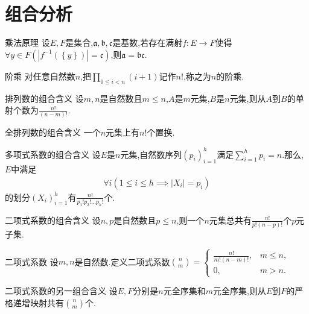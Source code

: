 \section{组合分析}

\begin{proposition}{乘法原理}{}
	设$E,F$是集合,$\mathfrak{a},\mathfrak{b},\mathfrak{c}$是基数,若存在满射$f:E\to F$使得$\forall y\in F\left(\left|f^{-1}\left(\left\{y\right\}\right)\right|=\mathfrak{c}\right)$,则$\mathfrak{a}=\mathfrak{b}\mathfrak{c}$.
\end{proposition}

\begin{definition}{阶乘}{}
	对任意自然数$n$,把$\prod\limits_{0\leq i<n}\left(i+1\right)$记作$n!$,称之为$n$的阶乘.
\end{definition}

\begin{proposition}{排列数的组合含义}{}
	设$m,n$是自然数且$m\leq n$,$A$是$m$元集,$B$是$n$元集,则从$A$到$B$的单射个数为$\frac{n!}{\left(n-m\right)!}$.
\end{proposition}

\begin{corollary}{全排列数的组合含义}{}
	一个$n$元集上有$n!$个置换.
\end{corollary}

\begin{proposition}{多项式系数的组合含义}{}
	设$E$是$n$元集,自然数序列$\left(p_{i}\right)_{i=1}^{h}$满足$\sum\limits_{i=1}^{h}p_{i}=n$.那么,$E$中满足
	\begin{align*}
		\forall i\left(1\leq i\leq h\implies\left|X_{i}\right|=p_{i}\right)
	\end{align*}
	的划分$\left(X_{i}\right)_{i=1}^{h}$有$\frac{n!}{p_{1}!p_{2}!\ldots p_{h}!}$个.
\end{proposition}

\begin{corollary}{二项式系数的组合含义}{}
	设$n,p$是自然数且$p\leq n$,则一个$n$元集总共有$\frac{n!}{p!\left(n-p\right)!}$个$p$元子集.
\end{corollary}

\begin{definition}{二项式系数}{}
	设$m,n$是自然数.定义二项式系数$\binom{n}{m}=
	\begin{cases}
		\frac{n!}{m!\left(n-m\right)!},&m\leq n,\\
		0,&m>n.
	\end{cases}$
\end{definition}

\begin{corollary}{二项式系数的另一组合含义}{}
	设$E,F$分别是$n$元全序集和$m$元全序集,则从$E$到$F$的严格递增映射共有$\binom{n}{m}$个.
\end{corollary}

